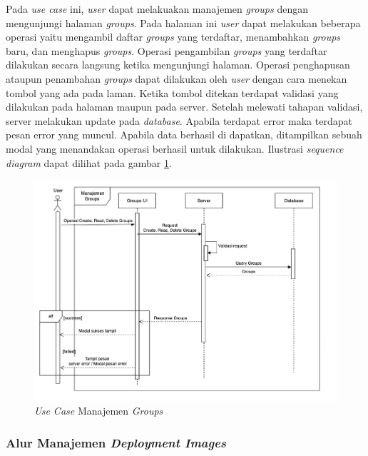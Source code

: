 Pada \textit{use case} ini, \textit{user} dapat melakuakan manajemen \textit{groups} dengan mengunjungi halaman \textit{groups}. Pada halaman ini \textit{user} dapat melakukan beberapa operasi yaitu mengambil daftar \textit{groups} yang terdaftar, menambahkan \textit{groups} baru, dan menghapus \textit{groups}. Operasi pengambilan \textit{groups} yang terdaftar dilakukan secara langsung ketika mengunjungi halaman. Operasi penghapusan ataupun penambahan \textit{groups} dapat dilakukan oleh \textit{user} dengan cara menekan tombol yang ada pada laman. Ketika tombol ditekan terdapat validasi yang dilakukan pada halaman maupun pada server. Setelah melewati tahapan validasi, server melakukan update pada \textit{database}. Apabila terdapat error maka terdapat pesan error yang muncul. Apabila data berhasil di dapatkan, ditampilkan sebuah modal yang menandakan operasi berhasil untuk dilakukan. Ilustrasi \textit{sequence diagram} dapat dilihat pada gambar \ref{fig:usecase-09}.


\begin{figure}[ht]
  \centering
  \includegraphics[width=1\textwidth]{resources/chapter-3/usecase/uc-09.jpg}
  \caption{\textit{Use Case} Manajemen \textit{Groups}}
  \label{fig:usecase-09}
\end{figure}

\pagebreak

\subsubsection{Alur Manajemen \textit{Deployment Images}}

